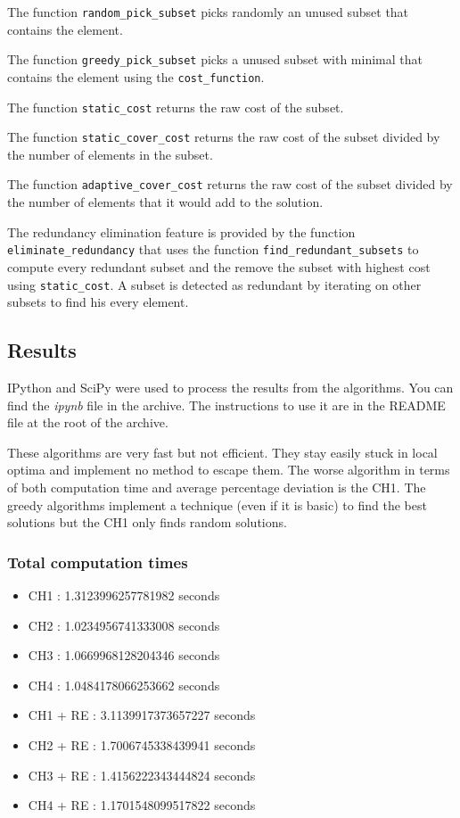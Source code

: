 \documentclass[a4paper,12pt]{article}
\begin{document}
The function \texttt{random\_pick\_subset} picks randomly an unused subset that contains the element.

The function \texttt{greedy\_pick\_subset} picks a unused subset with minimal that contains the element using the \texttt{cost\_function}.

The function \texttt{static\_cost} returns the raw cost of the subset.

The function \texttt{static\_cover\_cost} returns the raw cost of the subset divided by the number of elements in the subset.

The function \texttt{adaptive\_cover\_cost} returns the raw cost of the subset divided by the number of elements that it would add to the solution.

The redundancy elimination feature is provided by the function \texttt{eliminate\_redundancy} that uses the function \texttt{find\_redundant\_subsets} to compute every redundant subset and the remove the subset with highest cost using \texttt{static\_cost}.
A subset is detected as redundant by iterating on other subsets to find his every element.

\subsection{Results}

IPython and SciPy were used to process the results from the algorithms. You can find the \textit{ipynb} file in the archive. The instructions to use it are in the README file at the root of the archive.

These algorithms are very fast but not efficient. They stay easily stuck in local optima and implement no method to escape them. The worse algorithm in terms of both computation time and average percentage deviation is the CH1. The greedy algorithms implement a technique (even if it is basic) to find the best solutions but the CH1 only finds random solutions.

\subsubsection{Total computation times}

\begin{itemize}
    \item CH1 : 1.3123996257781982 seconds
    \item CH2 : 1.0234956741333008 seconds
    \item CH3 : 1.0669968128204346 seconds
    \item CH4 : 1.0484178066253662 seconds
    \item CH1 + RE : 3.1139917373657227 seconds
    \item CH2 + RE : 1.7006745338439941 seconds
    \item CH3 + RE : 1.4156222343444824 seconds
    \item CH4 + RE : 1.1701548099517822 seconds
\end{itemize}
\end{document}
